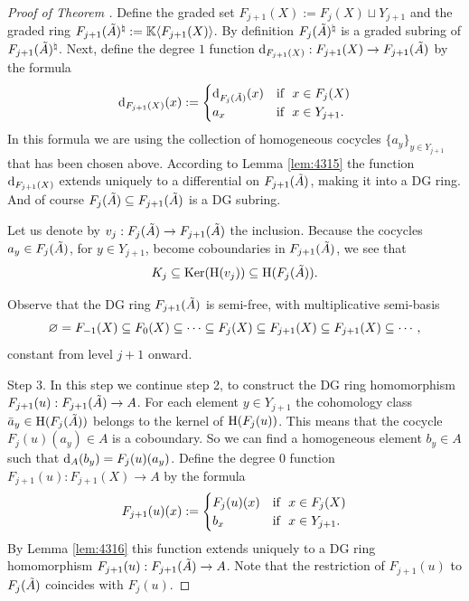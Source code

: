 \begin{proof}[Proof of Theorem \tup{\ref{thm:4310}}]
Define the graded set 
$F_{j + 1}(X) := F_{j}(X) \sqcup Y_{j + 1}$
and the graded ring \lb 
$F_{j + 1}(\tilde{A})^{\natural} := \mathbb{K} \langle  F_{j + 1}(X)  \rangle$.
By definition $F_{j}(\tilde{A})^{\natural}$ is a graded subring of 
$F_{j + 1}(\tilde{A})^{\natural}$. 
Next, define the degree $1$ function 
$\mathrm{d}_{F_{j + 1}(X)} : F_{j+ 1}(X) \to F_{j + 1}(\tilde{A})$
by the formula  
\[ \mathrm{d}_{F_{j + 1}(X)}(x) := 
\begin{cases}
\mathrm{d}_{F_{j}(\tilde{A})}(x) & \textup{if} \ \ x \in F_{j}(X)
\\
a_x & \textup{if} \ \ x \in Y_{j + 1} .   
\end{cases} \]
In this formula we are using the collection of homogeneous cocycles
$\{ a_y \}_{y \in Y_{j + 1}}$ that has been chosen above. 
According to Lemma \ref{lem:4315} the function $\mathrm{d}_{F_{j + 1}(X)}$ extends 
uniquely to a differential on $F_{j + 1}(\tilde{A})$, making it into a DG ring. 
And of course $F_{j}(\tilde{A}) \subseteq F_{j + 1}(\tilde{A})$
is a DG subring. 

Let us denote by 
$v_j : F_{j}(\tilde{A}) \to F_{j + 1}(\tilde{A})$
the inclusion. 
Because the cocycles $a_y \in F_{j}(\tilde{A})$, for $y \in Y_{j + 1}$, become 
coboundaries in $F_{j + 1}(\tilde{A})$, 
we see that 
\begin{equation} \label{eqn:4317}
K_j \subseteq \operatorname{Ker} (\operatorname{H}(v_j)) \subseteq \operatorname{H}(F_{j}(\tilde{A})) .
\end{equation}

Observe that the DG ring $F_{j + 1}(\tilde{A})$ is semi-free, with 
multiplicative semi-basis
\[ \varnothing = F_{-1}(X) \subseteq F_0(X) \subseteq \cdots \subseteq F_{j}(X) \subseteq 
F_{j + 1}(X) \subseteq F_{j + 1}(X) \subseteq \cdots , \]
constant from level $j + 1$ onward.

\medskip \noindent
Step 3. In this step we continue step 2, to construct the DG ring homomorphism 
$F_{j + 1}(u) : F_{j + 1}(\tilde{A}) \to A$.
For each element $y \in Y_{j + 1}$ the cohomology class 
$\bar{a}_y \in \operatorname{H}(F_{j}(\tilde{A}))$ belongs to the kernel of 
$\operatorname{H}(F_j(u))$. This means that the cocycle 
$F_j(u)(a_y) \in A$ is a coboundary. So we can find a homogeneous element
$b_y \in A$ such that 
$\mathrm{d}_A(b_y) = F_j(u)(a_y)$. 
Define the degree $0$ function 
$F_{j + 1}(u) : F_{j + 1}(X) \to A$
by the formula 
\[ F_{j + 1}(u)(x) := 
\begin{cases}
F_{j}(u)(x) & \textup{if} \ \ x \in F_{j}(X) 
\\
b_{x} & \textup{if} \ \ x \in Y_{j + 1}  .   
\end{cases} \]
By Lemma \ref{lem:4316} this function extends uniquely to a DG ring 
homomorphism 
$F_{j + 1}(u) : F_{j + 1}(\tilde{A}) \to A$.
Note that the restriction of $F_{j + 1}(u)$ to $F_{j}(\tilde{A})$
coincides with $F_{j}(u)$. 


\end{proof}
